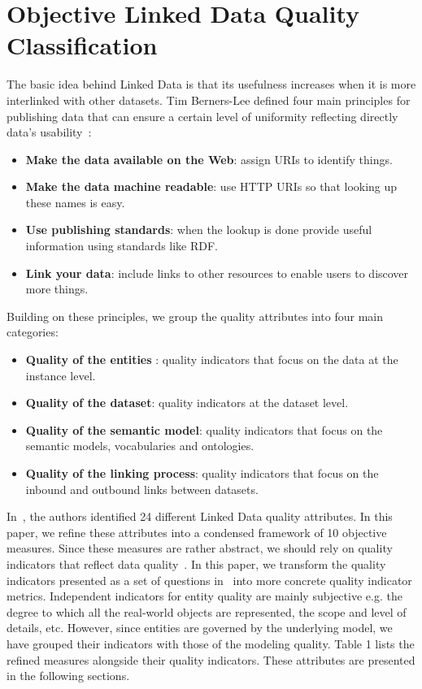 \section{Objective Linked Data Quality Classification}
\label{section:data-quality-classification}
The basic idea behind Linked Data is that its usefulness increases when it is more interlinked with other datasets. Tim Berners-Lee defined four main principles for publishing data that can ensure a certain level of uniformity reflecting directly data's usability~\cite{Berners-Lee:W3C:06}:
\begin{itemize}
\item{\bf Make the data available on the Web}: assign URIs to identify things.
\item{\bf Make the data machine readable}: use HTTP URIs so that looking up these names is easy.
\item{\bf Use publishing standards}: when the lookup is done provide useful information using standards like RDF.
\item{\bf Link your data}: include links to other resources to enable users to discover more things.\\
\end{itemize}

\noindent
Building on these principles, we group the quality attributes into four main categories:
\begin{itemize}
\ListProperties( Hang=true, Progressive=3ex, Style*=\tiny$\blacksquare$  )
\item{\bf Quality of the entities }: quality indicators that focus on the data at the instance level.
\item{\bf Quality of the dataset}: quality indicators at the dataset level.
\item{\bf Quality of the semantic model}: quality indicators that focus on the semantic models, vocabularies and ontologies.
\item{\bf Quality of the linking process}: quality indicators that focus on the inbound and outbound links between datasets.\\
\end{itemize}

In~\cite{Assaf:DQMST:12}, the authors identified 24 different Linked Data quality attributes. In this paper, we refine these attributes into a condensed framework of 10 objective measures. Since these measures are rather abstract, we should rely on quality indicators that reflect data quality~\cite{Flemming:Thesis:10}. In this paper, we transform the quality indicators presented as a set of questions in~\cite{Assaf:DQMST:12} into more concrete quality indicator metrics. Independent indicators for entity quality are mainly subjective e.g. the degree to which all the real-world objects are represented, the scope and level of details, etc. However, since entities are governed by the underlying model, we have grouped their indicators with those of the modeling quality. Table 1 lists the refined measures alongside their quality indicators. These attributes are presented in the following sections.

